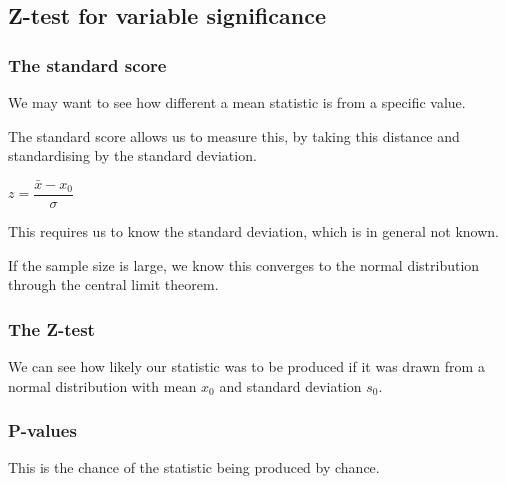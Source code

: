 
\subsection{Z-test for variable significance}

\subsubsection{The standard score}

We may want to see how different a mean statistic is from a specific value.

The standard score allows us to measure this, by taking this distance and standardising by the standard deviation.

\(z=\dfrac{\bar x-x_0}{\sigma }\)

This requires us to know the standard deviation, which is in general not known.

If the sample size is large, we know this converges to the normal distribution through the central limit theorem.

\subsubsection{The Z-test}

We can see how likely our statistic was to be produced if it was drawn from a normal distribution with mean \(x_0\) and standard deviation \(s_0\).

\subsubsection{P-values}

This is the chance of the statistic being produced by chance.

